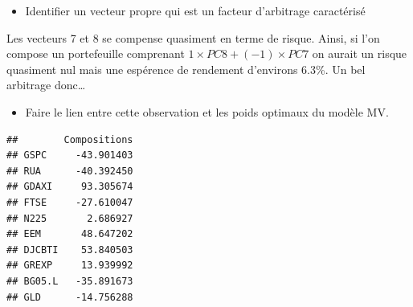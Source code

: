 \documentclass[
]{article}
\providecommand{\tightlist}{%
  \setlength{\itemsep}{0pt}\setlength{\parskip}{0pt}}
\begin{document}
\begin{itemize}
\tightlist
\item
  Identifier un vecteur propre qui est un facteur d'arbitrage
  caractérisé
\end{itemize}

Les vecteurs 7 et 8 se compense quasiment en terme de risque. Ainsi, si
l'on compose un portefeuille comprenant
\(1 \times PC8 + (-1) \times PC7\) on aurait un risque quasiment nul
mais une espérence de rendement d'environs 6.3\%. Un bel arbitrage
donc\ldots{}

\begin{itemize}
\tightlist
\item
  Faire le lien entre cette observation et les poids optimaux du modèle
  MV.
\end{itemize}

\begin{verbatim}
##        Compositions
## GSPC     -43.901403
## RUA      -40.392450
## GDAXI     93.305674
## FTSE     -27.610047
## N225       2.686927
## EEM       48.647202
## DJCBTI    53.840503
## GREXP     13.939992
## BG05.L   -35.891673
## GLD      -14.756288
\end{verbatim}
\end{document}
